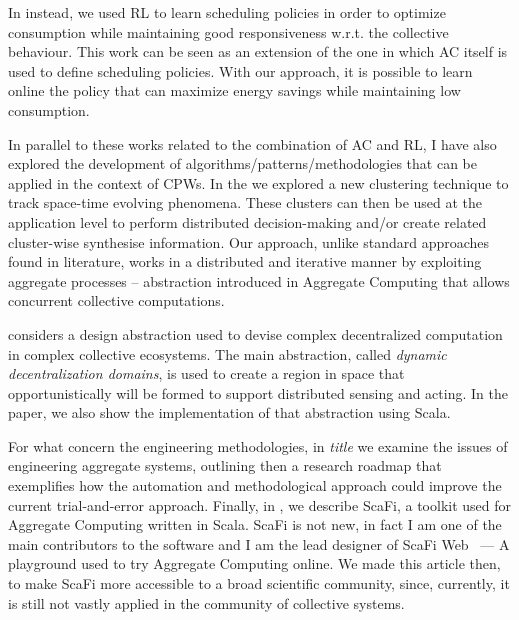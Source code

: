 \documentclass[11pt]{article}
\begin{document}
In \textit{} instead, 
 we used RL to learn scheduling policies 
 in order to optimize consumption 
 while maintaining good responsiveness w.r.t. the collective behaviour.  
This work can be seen as an extension of the one \textit{} 
 in which AC itself is used to define scheduling policies. 
With our approach, it is possible 
 to learn online the policy that can 
 maximize energy savings while maintaining low consumption.

In parallel to these works related to the combination of AC and RL, 
 I have also explored the development of algorithms/patterns/methodologies 
 that can be applied in the context of CPWs.
%
In the \textit{} 
 we explored a new clustering technique to track space-time evolving phenomena. 
% 
These clusters can then be used at the application level to perform 
 distributed decision-making and/or create related cluster-wise synthesise information.
Our approach, unlike standard approaches found in literature, 
 works in a distributed and iterative manner by exploiting 
 aggregate processes -- abstraction introduced in Aggregate Computing 
 that allows concurrent collective computations.

\textit{} considers a design abstraction used to
 devise complex decentralized computation in complex collective ecosystems.
%
The main abstraction, called \textit{dynamic decentralization domains}, is used to
 create a region in space that opportunistically will be formed to support distributed 
 sensing and acting.
%
In the paper, we also show the implementation of that abstraction using Scala.

For what concern the engineering methodologies, in \textit{\cite{engineering}{title}}
 we examine the issues of engineering aggregate systems, outlining then a research roadmap that exemplifies
 how the automation and methodological approach could improve the current
 trial-and-error approach.
%
Finally, in \textit{}, we describe ScaFi, 
 a toolkit used for Aggregate Computing written in Scala.
ScaFi is not new, in fact I am one of the main contributors to the software and I am the lead designer of
 ScaFi Web~\cite{aguzzi2021scafi} --- A playground used to try Aggregate Computing online.
We made this article then, to make ScaFi more accessible to a broad scientific community, 
 since, currently, it is still not vastly applied in the community of collective systems.
\end{document}
